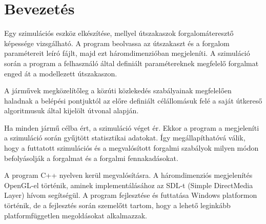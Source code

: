 \chapter{Bevezetés} %
\label{ch:intro}

Egy szimulációs eszköz elkészítése, mellyel útszakaszok forgalomáteresztő képessége vizsgálható.
A program beolvassa az útszakaszt és a forgalom paramétereit leíró fájlt, majd ezt háromdimenzióban megjeleníti.
A szimuláció során a program a felhasználó által definiált paramétereknek megfelelő forgalmat enged át a modellezett útszakaszon.

A járművek megközelítőleg a közúti közlekedés szabályainak megfelelően haladnak a belépési pontjuktól az előre definiált célállomásuk felé a saját útkereső algoritmusuk által kijelölt útvonal alapján.

Ha minden jármű célba ért, a szimuláció véget ér. Ekkor a program a megjeleníti a szimuláció során gyűjtött statisztikai adatokat. Így megállapíthatóvá válik, hogy a futtatott szimulációs és a megvalósított forgalmi szabályok milyen módon befolyásolják a forgalmat és a forgalmi fennakadásokat.

A program C++ nyelven kerül megvalósításra. A háromdimenziós megjelenítés OpenGL-el történik, aminek implementálásához az  SDL-t (Simple DirectMedia Layer) hívom segítségül.
A program fejlesztése és futtatása Windows platformon történik, de a fejlesztés során szemelőtt tartom, hogy a lehető leginkább platformfüggetlen megoldásokat alkalmazzak.
